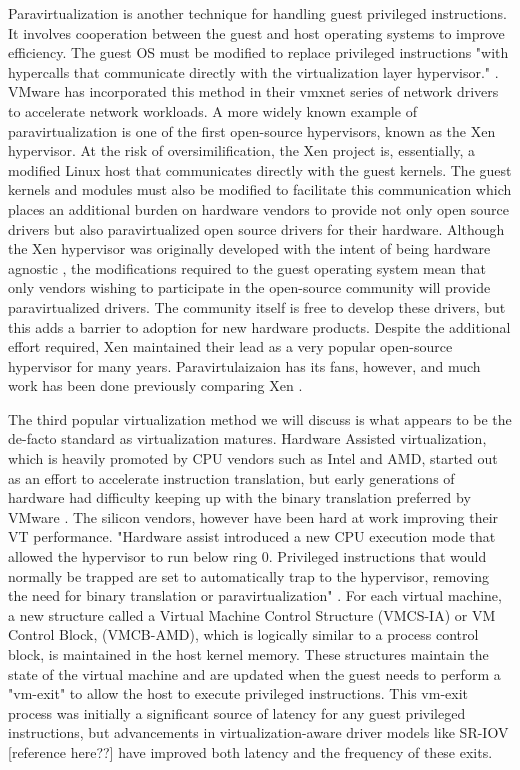 Paravirtualization is another technique for handling guest privileged instructions.  It involves cooperation between the guest and host operating systems to improve efficiency.  The guest OS must be modified to replace privileged instructions "with hypercalls that communicate directly with the virtualization layer hypervisor." \autocite{_vmware_1}.  VMware has incorporated this method in their vmxnet series of network drivers to accelerate network workloads.  A more widely known example of paravirtualization is one of the first open-source hypervisors, known as the Xen hypervisor.  At the risk of oversimilification, the Xen project is, essentially, a modified Linux host that communicates directly with the guest kernels.  The guest kernels and modules must also be modified to facilitate this communication which places an additional burden on hardware vendors to provide not only open source drivers but also paravirtualized open source drivers for their hardware.  Although the Xen hypervisor was originally developed with the intent of being hardware agnostic \autocite{_barham_1}, the modifications required to the guest operating system mean that only vendors wishing to participate in the open-source community will provide paravirtualized drivers.  The community itself is free to develop these drivers, but this adds a barrier to adoption for new hardware products.  Despite the additional effort required, Xen maintained their lead as a very popular open-source hypervisor for many years.  Paravirtulaizaion has its fans, however, and much work has been done previously comparing Xen \autocite{_felter_1, _younge_1, _wang_1, _che_1, _scheepers_1, _wang_2}.

The third popular virtualization method we will discuss is what appears to be the de-facto standard as virtualization matures.  Hardware Assisted virtualization, which is heavily promoted by CPU vendors such as Intel and AMD, started out as an effort to accelerate instruction translation, but early generations of hardware had difficulty keeping up with the binary translation preferred by VMware \autocite{_vmware_1}.  The silicon vendors, however have been hard at work improving their VT performance.  "Hardware assist introduced a new CPU execution mode that allowed the hypervisor to run below ring 0.  Privileged instructions that would normally be trapped are set to automatically trap to the hypervisor, removing the need for binary translation or paravirtualization" \autocite{_vmware_1}.  For each virtual machine, a new structure called a Virtual Machine Control Structure (VMCS-IA) or VM Control Block, (VMCB-AMD), which is logically similar to a process control block,  is maintained in the host kernel memory. \autocite{_vmware_1} These structures maintain the state of the virtual machine and are updated when the guest needs to perform a "vm-exit" to allow the host to execute privileged instructions.  This vm-exit process was initially a significant source of latency for any guest privileged instructions, but advancements in virtualization-aware driver models like SR-IOV [reference here??] have improved both latency and the frequency of these exits.  

